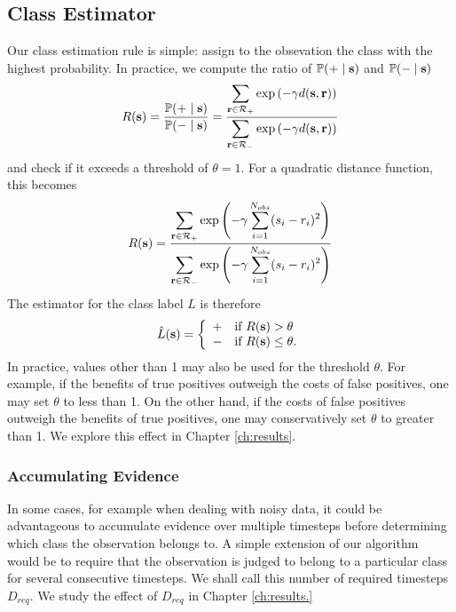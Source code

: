 \subsection{Class Estimator}
Our class estimation rule is simple: assign to the obsevation the class with the
highest probability. In practice, we compute the ratio of $\mathbb{P}(+ \;|\; \mathbf s)$
and $\mathbb{P}(- \;|\; \mathbf s)$ 
\begin{gather}
R(\mathbf s) = \frac{\mathbb{P}(+ \;|\; \mathbf s)}{\mathbb{P}(- \;|\; \mathbf s)} = \frac{\displaystyle \sum_{\mathbf r \in \mathcal{R}_+} \exp \left(-\gamma d(\mathbf s,\mathbf r)\right)}{\displaystyle \sum_{\mathbf r \in \mathcal{R}_-} \exp \left(-\gamma d(\mathbf s,\mathbf r)\right)}
\end{gather}
and check if it exceeds a threshold of $\theta = 1$. For a quadratic distance function, this becomes
\begin{gather}
R(\mathbf s) = \frac{\displaystyle \sum_{\mathbf r \in \mathcal{R}_+} \exp \left(-\gamma \displaystyle \sum_{i=1}^{N_{obs}} (s_i - r_i)^2\right)}{\displaystyle \sum_{\mathbf r \in \mathcal{R}_-} \exp \left(-\gamma \displaystyle \sum_{i=1}^{N_{obs}} (s_i - r_i)^2\right)}
\end{gather}
The estimator for the class label $L$ is therefore
\begin{gather}
\hat{L}(\mathbf s) = \left\{
\begin{array}{ll}
+ & \text{if } R(\mathbf s) > \theta\\
- & \text{if } R(\mathbf s) \leq \theta.
\end{array}
\right.
\end{gather}
In practice, values other than 1 may also be used for the threshold $\theta$. For
example, if the benefits of true positives outweigh the costs of false
positives, one may set $\theta$ to less than 1. On the other hand, if the
costs of false positives outweigh the benefits of true positives, one may
conservatively set $\theta$ to greater than 1. We explore this effect in
Chapter \ref{ch:results}.

\subsubsection{Accumulating Evidence}
In some cases, for example when dealing with noisy data, it could be
advantageous to accumulate evidence over multiple timesteps before determining
which class the observation belongs to. A simple extension of our algorithm
would be to require that the observation is judged to belong to a particular
class for several consecutive timesteps. We shall call this number of required
timesteps $D_{req}$. We study the effect of $D_{req}$ in Chapter \ref{ch:results.}

